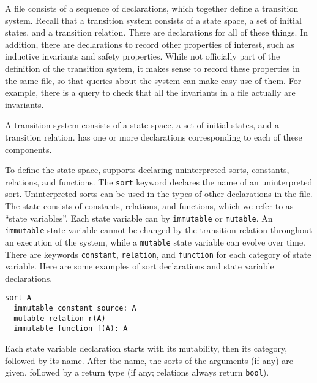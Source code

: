 A \mypyvy file consists of a sequence of declarations,
  which together define a transition system.
Recall that a transition system consists of a state space,
  a set of initial states,
  and a transition relation.
There are declarations for all of these things.
In addition, there are declarations to record other properties of interest,
  such as inductive invariants and safety properties.
While not officially part of the definition of the transition system,
  it makes sense to record these properties in the same file,
  so that queries about the system can make easy use of them.
For example, there is a query to check that all the invariants in a file
  actually are invariants.


A transition system consists of a state space, a set of initial states, and a transition relation.
\mypyvy has one or more declarations corresponding to each of these components.

To define the state space,
  \mypyvy supports declaring uninterpreted sorts, constants, relations, and functions.
The \lstinline[language=mypyvy]{sort} keyword declares the name of an uninterpreted sort.
Uninterpreted sorts can be used in the types of other declarations in the file.
The state consists of constants, relations, and functions, which we refer to as ``state variables''.
Each state variable can by \lstinline[language=mypyvy]{immutable} or \lstinline[language=mypyvy]{mutable}.
An \lstinline[language=mypyvy]{immutable} state variable cannot be changed by the transition relation throughout an execution of the system,
  while a \lstinline[language=mypyvy]{mutable} state variable can evolve over time.
There are keywords \lstinline[language=mypyvy]{constant}, \lstinline[language=mypyvy]{relation}, and \lstinline[language=mypyvy]{function}
  for each category of state variable.
Here are some examples of sort declarations and state variable declarations.
\begin{lstlisting}[language=mypyvy, xleftmargin=.2\textwidth, xrightmargin=.2\textwidth]
  sort A
  immutable constant source: A
  mutable relation r(A)
  immutable function f(A): A
\end{lstlisting}
Each state variable declaration starts with its mutability, then its category, followed by its name.
After the name, the sorts of the arguments (if any) are given,
followed by a return type (if any; relations always return \lstinline[language=mypyvy]{bool}).


